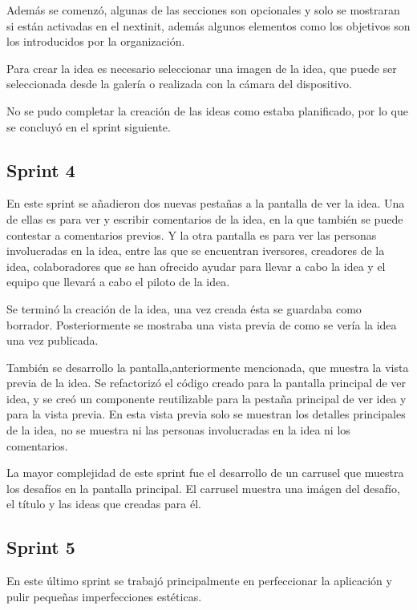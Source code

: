Además se comenzó, algunas de las secciones son opcionales y solo se mostraran si están activadas en 
el nextinit, además algunos elementos como los objetivos son los introducidos por la organización. 

Para crear la idea es necesario seleccionar una imagen de la idea, que puede ser seleccionada desde la galería o realizada con la cámara 
del dispositivo.

No se pudo completar la creación de las ideas como estaba planificado, por lo que se concluyó en el sprint siguiente.

\subsection{Sprint 4}

En este sprint se añadieron dos nuevas pestañas a la pantalla de ver la idea. Una de ellas es para ver y escribir comentarios de la idea, 
en la que también se puede contestar a comentarios previos. Y la otra pantalla es para ver las personas involucradas en la idea, entre 
las que se encuentran iversores, creadores de la idea, colaboradores que se han ofrecido ayudar para llevar a cabo la idea y el equipo 
que llevará a cabo el piloto de la idea.

Se terminó la creación de la idea, una vez creada ésta se guardaba como borrador. Posteriormente se mostraba una vista previa de 
como se vería la idea una vez publicada.

También se desarrollo la pantalla,anteriormente mencionada, que muestra la vista previa de la idea. Se refactorizó el código creado 
para la pantalla principal de ver idea, y se creó un componente reutilizable para la pestaña principal de ver idea y para la vista previa. En 
esta vista previa solo se muestran los detalles principales de la idea, no se muestra ni las personas involucradas en la idea ni los 
comentarios.

La mayor complejidad de este sprint fue el desarrollo de un carrusel que muestra los desafíos en la pantalla principal. El carrusel muestra una imágen del desafío, 
el título y las ideas que creadas para él.

\subsection{Sprint 5}

En este último sprint se trabajó principalmente en perfeccionar la aplicación y pulir pequeñas imperfecciones estéticas. 


